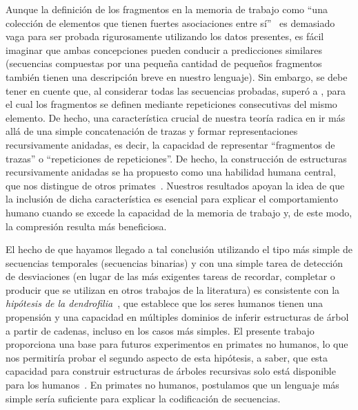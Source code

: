 Aunque la definición de los fragmentos en la memoria de trabajo como ``una colección de elementos que tienen fuertes asociaciones entre sí''~\cite{f25,f110} es demasiado vaga para ser probada rigurosamente utilizando los datos presentes, es fácil imaginar que ambas concepciones pueden conducir a predicciones similares (secuencias compuestas por una pequeña cantidad de pequeños fragmentos también tienen una descripción breve en nuestro lenguaje). Sin embargo, se debe tener en cuente que, al considerar todas las secuencias probadas, \mdlbin superó a \mdlbinfrag, para el cual los fragmentos se definen mediante repeticiones consecutivas del mismo elemento. De hecho, una característica crucial de nuestra teoría radica en ir más allá de una simple concatenación de trazas y formar representaciones recursivamente anidadas, es decir, la capacidad de representar ``fragmentos de trazas'' o ``repeticiones de repeticiones''. De hecho, la construcción de estructuras recursivamente anidadas se ha propuesto como una habilidad humana central, que nos distingue de otros primates~\cite{f4,f6,f7,f111}. Nuestros resultados apoyan la idea de que la inclusión de dicha característica es esencial para explicar el comportamiento humano cuando se excede la capacidad de la memoria de trabajo y, de este modo, la compresión resulta más beneficiosa.


El hecho de que hayamos llegado a tal conclusión utilizando el tipo más simple de secuencias temporales (secuencias binarias) y con una simple tarea de detección de desviaciones (en lugar de las más exigentes tareas de recordar, completar o producir que se utilizan en otros trabajos de la literatura) es consistente con la \textit{hipótesis de la dendrofilia}~\cite{f8}, que establece que los seres humanos tienen una propensión y una capacidad en múltiples dominios de inferir estructuras de árbol a partir de cadenas, incluso en los casos más simples. El presente trabajo proporciona una base para futuros experimentos en primates no humanos, lo que nos permitiría probar el segundo aspecto de esta hipótesis, a saber, que esta capacidad para construir estructuras de árboles recursivas solo está disponible para los humanos~\cite{f4,f6,f8}. En primates no humanos, postulamos que un lenguaje más simple sería suficiente para explicar la codificación de secuencias.

